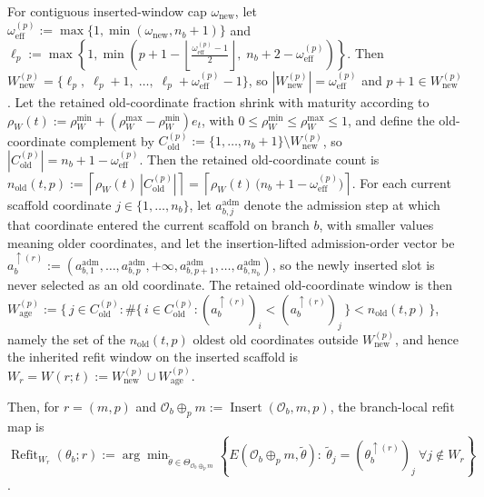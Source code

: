 \documentclass[11pt]{article}
\begin{document}
For contiguous inserted-window cap \(\omega_{\mathrm{new}}\), let \(\omega_{\mathrm{eff}}^{(p)}:=\max\{1,\min(\omega_{\mathrm{new}},n_b+1)\}\) and \(\ell_p:=\max\!\left\{1,\min\!\left(p+1-\left\lfloor\frac{\omega_{\mathrm{eff}}^{(p)}-1}{2}\right\rfloor,\;n_b+2-\omega_{\mathrm{eff}}^{(p)}\right)\right\}\). Then \(W_{\mathrm{new}}^{(p)}=\{\ell_p,\;\ell_p+1,\;\ldots,\;\ell_p+\omega_{\mathrm{eff}}^{(p)}-1\}\), so \(|W_{\mathrm{new}}^{(p)}|=\omega_{\mathrm{eff}}^{(p)}\) and \(p+1\in W_{\mathrm{new}}^{(p)}\). Let the retained old-coordinate fraction shrink with maturity according to \(\rho_W(t):=\rho_W^{\min}+(\rho_W^{\max}-\rho_W^{\min})e_t\), with \(0\le \rho_W^{\min}\le \rho_W^{\max}\le 1\), and define the old-coordinate complement by \(C_{\mathrm{old}}^{(p)}:=\{1,\dots,n_b+1\}\setminus W_{\mathrm{new}}^{(p)}\), so \(|C_{\mathrm{old}}^{(p)}|=n_b+1-\omega_{\mathrm{eff}}^{(p)}\). Then the retained old-coordinate count is \(n_{\mathrm{old}}(t,p):=\left\lceil \rho_W(t)\,|C_{\mathrm{old}}^{(p)}|\right\rceil=\left\lceil \rho_W(t)\,\bigl(n_b+1-\omega_{\mathrm{eff}}^{(p)}\bigr)\right\rceil\). For each current scaffold coordinate \(j\in\{1,\dots,n_b\}\), let \(a_{b,j}^{\mathrm{adm}}\) denote the admission step at which that coordinate entered the current scaffold on branch \(b\), with smaller values meaning older coordinates, and let the insertion-lifted admission-order vector be \(a_b^{\uparrow(r)}:=(a_{b,1}^{\mathrm{adm}},\dots,a_{b,p}^{\mathrm{adm}},+\infty,a_{b,p+1}^{\mathrm{adm}},\dots,a_{b,n_b}^{\mathrm{adm}})\), so the newly inserted slot is never selected as an old coordinate. The retained old-coordinate window is then \(W_{\mathrm{age}}^{(p)}:=\{\,j\in C_{\mathrm{old}}^{(p)}:\#\{\,i\in C_{\mathrm{old}}^{(p)}:(a_b^{\uparrow(r)})_i<(a_b^{\uparrow(r)})_j\,\}<n_{\mathrm{old}}(t,p)\,\}\), namely the set of the \(n_{\mathrm{old}}(t,p)\) oldest old coordinates outside \(W_{\mathrm{new}}^{(p)}\), and hence the inherited refit window on the inserted scaffold is \(W_r=W(r;t):=W_{\mathrm{new}}^{(p)}\cup W_{\mathrm{age}}^{(p)}\).

Then, for \(r=(m,p)\) and \(\mathcal O_b\oplus_p m:=\operatorname{Insert}(\mathcal O_b,m,p)\), the branch-local refit map is \(\operatorname{Refit}_{W_r}(\theta_b;r):=\arg\min_{\widetilde\theta\in\Theta_{\mathcal O_b\oplus_p m}}\left\{E(\mathcal O_b\oplus_p m,\widetilde\theta):\ \widetilde\theta_j=(\theta_b^{\uparrow(r)})_j\ \forall j\notin W_r\right\}\).
\end{document}
